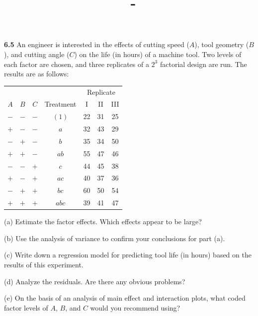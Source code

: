 \documentclass[answers,12pt,addpoints]{exam}
\author{\name}
\title{\course \ - \assignment}
\begin{document}
\maketitle

\newpage

\textbf{6.5}
An engineer is interested in the effects of cutting speed ($A$), tool geometry ($B$), and cutting angle ($C$) on the life (in hours) of a machine tool. Two levels of each factor are chosen, and three replicates of a $2^3$ factorial design are run. The results are as follows:

\begin{center}
\begin{tabular}{ccccccc}
\hline
 & & & & \multicolumn{3}{c}{Replicate} \\
$A$ & $B$ & $C$ & Treatment & I & II & III \\
\hline
$-$ & $-$ & $-$ & $(1)$  & 22 & 31 & 25 \\
$+$ & $-$ & $-$ & $a$    & 32 & 43 & 29 \\
$-$ & $+$ & $-$ & $b$    & 35 & 34 & 50 \\
$+$ & $+$ & $-$ & $ab$   & 55 & 47 & 46 \\
$-$ & $-$ & $+$ & $c$    & 44 & 45 & 38 \\
$+$ & $-$ & $+$ & $ac$   & 40 & 37 & 36 \\
$-$ & $+$ & $+$ & $bc$   & 60 & 50 & 54 \\
$+$ & $+$ & $+$ & $abc$  & 39 & 41 & 47 \\
\hline
\end{tabular}
\end{center}

\noindent
(a) Estimate the factor effects. Which effects appear to be large?

\noindent
(b) Use the analysis of variance to confirm your conclusions for part (a).

\noindent
(c) Write down a regression model for predicting tool life (in hours) based on the results of this experiment.

\noindent
(d) Analyze the residuals. Are there any obvious problems?

\noindent
(e) On the basis of an analysis of main effect and interaction plots, what coded factor levels of $A$, $B$, and $C$ would you recommend using?
\end{document}
